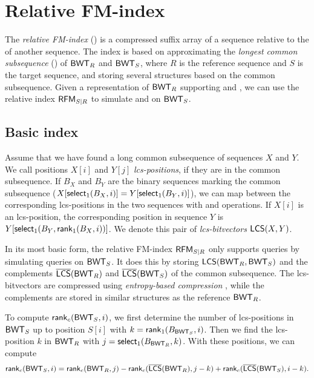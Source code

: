 
\section{Relative FM-index}

The \emph{relative FM-index} (\RFM) \cite{Belazzougui2014} is a compressed
suffix array of a sequence relative to the \CSA{} of another sequence.
The index is based on approximating the
\emph{longest common subsequence} (\LCS) of $\mathsf{BWT}_{R}$ and $\mathsf{BWT}_{S}$,
where $R$ is the reference sequence and $S$ is the target sequence, and
storing several structures based on the common subsequence. Given a
representation of $\mathsf{BWT}_{R}$ supporting \rank{} and \select{}, we can use the
relative index $\mathsf{RFM}_{S \mid R}$ to simulate \rank{} and \select{} on
$\mathsf{BWT}_{S}$.

\subsection{Basic index}

Assume that we have found a long common subsequence of sequences $X$ and $Y$.
We call positions $X[i]$ and $Y[j]$ \emph{lcs-positions}, if they are in the
common subsequence. If $B_{X}$ and $B_{Y}$ are the binary sequences marking
the common subsequence ($X[\textsf{select}_1(B_{X},i)] = Y[\textsf{select}_1(B_{Y},i)]$), we can map between the
corresponding lcs-positions in the two sequences with \rank{} and \select{}
operations. If $X[i]$ is an lcs-position, the corresponding position in
sequence $Y$ is $Y[\mathsf{select}_{1}(B_{Y}, \mathsf{rank}_{1}(B_{X}, i))]$. We denote this
pair of \emph{lcs-bitvectors} $\mathsf{LCS}(X,Y)$.

In its most basic form, the relative FM-index $\mathsf{RFM}_{S \mid R}$ only supports
\find{} queries by simulating \rank{} queries on $\mathsf{BWT}_{S}$. It does this by
storing $\mathsf{LCS}(\textsf{BWT}_{R},\textsf{BWT}_{S})$ and the complements $\overline{ \mathsf{LCS} }(\mathsf{BWT}_{R})$ and
$\overline{ \mathsf{LCS} }(\mathsf{BWT}_{S})$ of the common subsequence. The lcs-bitvectors are compressed
using \emph{entropy-based compression} \cite{Raman2007}, while the complements
are stored in similar structures as the reference $\mathsf{BWT}_{R}$.

To compute $\mathsf{rank}_{c}(\mathsf{BWT}_{S}, i)$, we first determine the number of
lcs-positions in $\mathsf{BWT}_{S}$ up to position $S[i]$ with $k =
\mathsf{rank}_{1}(B_{\mathsf{BWT}_{S}}, i)$. Then we find the lcs-position $k$ in $\mathsf{BWT}_{R}$
with $j = \mathsf{select}_{1}(B_{\mathsf{BWT}_{R}}, k)$. With these positions, we can compute
$$
\mathsf{rank}_{c}(\mathsf{BWT}_{S}, i) = \mathsf{rank}_{c}(\mathsf{BWT}_{R}, j) - \mathsf{rank}_{c}(\overline{ \mathsf{LCS} }(\mathsf{BWT}_{R}),
j-k) + \mathsf{rank}_{c}(\overline{ \mathsf{LCS} }(\mathsf{BWT}_{S}), i-k).
$$

